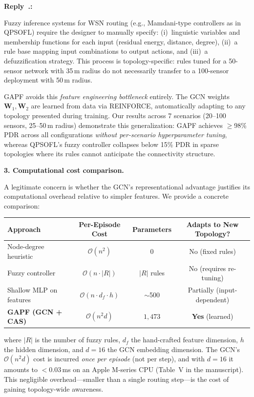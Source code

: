 \documentclass[11pt]{article}
\newcounter{reviewer}
\newcounter{replyctr}[reviewer]
\renewcommand{\thereplyctr}{\thereviewer.\arabic{replyctr}}
\newenvironment{reply}
  {\refstepcounter{replyctr}%
   \addtocounter{replyctr}{-1}%
   \medskip\noindent
   \begin{sf}\textbf{Reply~\thereplyctr:}\ }
  {\addtocounter{replyctr}{1}%
   \medskip\end{sf}}
\begin{document}
\begin{reply}
\begin{mdframed}[style=Resp]
Fuzzy inference systems for WSN routing (e.g., Mamdani-type controllers as in QPSOFL) require the designer to manually specify: (i)~linguistic variables and membership functions for each input (residual energy, distance, degree), (ii)~a rule base mapping input combinations to output actions, and (iii)~a defuzzification strategy. This process is topology-specific: rules tuned for a 50-sensor network with 35\,m radius do not necessarily transfer to a 100-sensor deployment with 50\,m radius.

GAPF avoids this \emph{feature engineering bottleneck} entirely. The GCN weights $\mathbf{W}_1, \mathbf{W}_2$ are learned from data via REINFORCE, automatically adapting to any topology presented during training. Our results across 7 scenarios (20--100 sensors, 25--50\,m radius) demonstrate this generalization: GAPF achieves $\geq$98\% PDR across all configurations \emph{without per-scenario hyperparameter tuning}, whereas QPSOFL's fuzzy controller collapses below 15\% PDR in sparse topologies where its rules cannot anticipate the connectivity structure.

\medskip
\noindent\textbf{3. Computational cost comparison.}

A legitimate concern is whether the GCN's representational advantage justifies its computational overhead relative to simpler features. We provide a concrete comparison:

\begin{center}
\begin{tabular}{lccc}
\toprule
\textbf{Approach} & \textbf{Per-Episode Cost} & \textbf{Parameters} & \textbf{Adapts to New Topology?} \\
\midrule
Node-degree heuristic & $\mathcal{O}(n^2)$ & 0 & No (fixed rules) \\
Fuzzy controller & $\mathcal{O}(n \cdot |R|)$ & $|R|$ rules & No (requires re-tuning) \\
Shallow MLP on features & $\mathcal{O}(n \cdot d_f \cdot h)$ & $\sim$500 & Partially (input-dependent) \\
\textbf{GAPF (GCN + CAS)} & $\mathcal{O}(n^2 d)$ & $1{,}473$ & \textbf{Yes} (learned) \\
\bottomrule
\end{tabular}
\end{center}

\noindent where $|R|$ is the number of fuzzy rules, $d_f$ the hand-crafted feature dimension, $h$ the hidden dimension, and $d = 16$ the GCN embedding dimension. The GCN's $\mathcal{O}(n^2 d)$ cost is incurred \emph{once per episode} (not per step), and with $d = 16$ it amounts to $<0.03$\,ms on an Apple M-series CPU (Table~V in the manuscript). This negligible overhead---smaller than a single routing step---is the cost of gaining topology-wide awareness.


\end{mdframed}
\end{reply}
\end{document}
